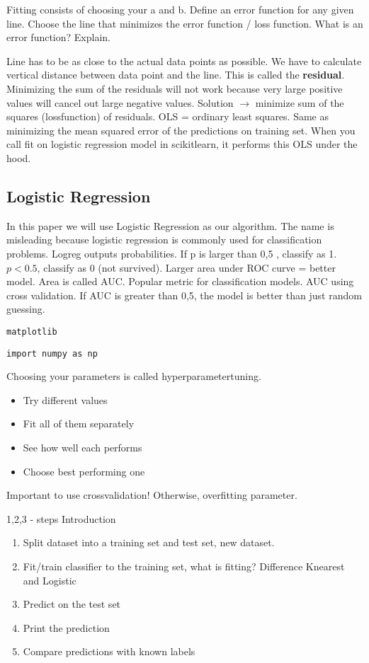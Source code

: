 \documentclass[11pt]{article}
\begin{document}
Fitting consists of choosing your a and b. Define an error function for any given line. Choose the line that minimizes the error function / loss function. What is an error function? Explain.

Line has to be as close to the actual data points as possible. We have to calculate vertical distance between data point and the line. This is called the \textbf{residual}. Minimizing the sum of the residuals will not work because very large positive values will cancel out large negative values. Solution \(\rightarrow\)  minimize sum of the squares (lossfunction) of residuals. OLS = ordinary least squares. Same as minimizing the mean squared error of the predictions on training set. When you call fit on logistic regression model in scikitlearn, it performs this OLS under the hood. 

\subsection{Logistic Regression}
\label{sec:orgee531b7}
In this paper we will use Logistic Regression as our algorithm. The name is misleading because logistic regression is commonly used for classification problems. Logreg outputs probabilities. If p is larger than 0,5 , classify as 1. \(p<0.5\), classify as 0 (not survived). Larger area under ROC curve = better model. Area is called AUC. Popular metric for classification models. AUC using cross validation. If AUC is greater than 0,5, the model is better than just random guessing. 


\texttt{matplotlib}

\begin{verbatim}
import numpy as np
\end{verbatim}



Choosing your parameters is called hyperparametertuning. 
\begin{itemize}
\item Try different values
\item Fit all of them separately
\item See how well each performs
\item Choose best performing one
\end{itemize}
Important to use crossvalidation! Otherwise, overfitting parameter. 

1,2,3 - steps Introduction
\begin{enumerate}
\item Split dataset into a training set and test set, new dataset.
\item Fit/train classifier to the training set, what is fitting? Difference Knearest and Logistic
\item Predict on the test set
\item Print the prediction
\item Compare predictions with known labels
\end{enumerate}
\end{document}
